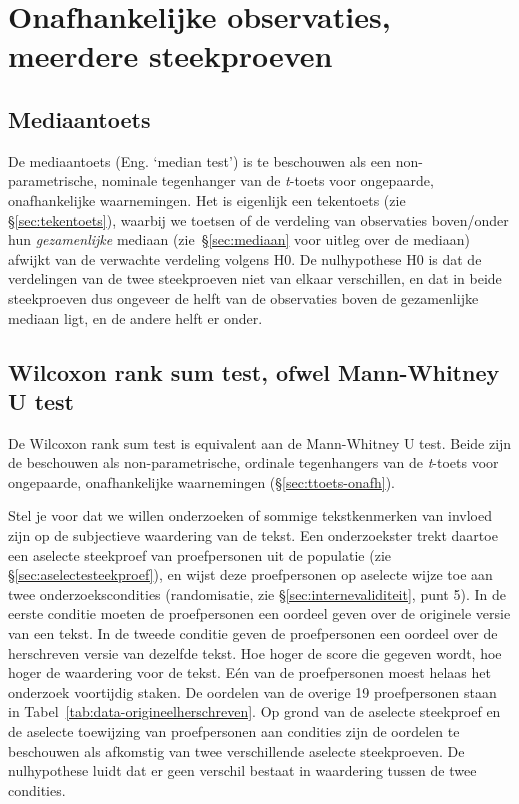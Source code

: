 \documentclass[
]{book}
\begin{document}
\section{Onafhankelijke observaties, meerdere steekproeven}\label{onafhankelijke-observaties-meerdere-steekproeven}

\subsection{Mediaantoets}\label{mediaantoets}

De mediaantoets (Eng. `median test') is te beschouwen als een non-parametrische, nominale
tegenhanger van de \emph{t}-toets voor ongepaarde, onafhankelijke waarnemingen. Het is
eigenlijk een tekentoets (zie §\ref{sec:tekentoets}), waarbij we toetsen of de verdeling van
observaties boven/onder hun \emph{gezamenlijke} mediaan
(zie~§\ref{sec:mediaan} voor uitleg over de mediaan) afwijkt van de verwachte verdeling volgens H0.
De nulhypothese H0 is dat de verdelingen van de twee steekproeven niet
van elkaar verschillen, en dat in beide steekproeven dus ongeveer de
helft van de observaties boven de gezamenlijke mediaan ligt, en de
andere helft er onder.

\subsection{Wilcoxon rank sum test, ofwel Mann-Whitney U test}\label{sec:wilcoxon-rank-sum}

De Wilcoxon rank sum test is equivalent aan de Mann-Whitney U test.
Beide zijn de beschouwen als non-parametrische, ordinale tegenhangers
van de \emph{t}-toets voor ongepaarde, onafhankelijke waarnemingen
(§\ref{sec:ttoets-onafh}).

Stel je voor dat we willen onderzoeken of sommige tekstkenmerken van
invloed zijn op de subjectieve waardering van de tekst. Een
onderzoekster trekt daartoe een aselecte steekproef van proefpersonen
uit de populatie (zie
§\ref{sec:aselectesteekproef}), en wijst deze proefpersonen op
aselecte wijze toe aan twee onderzoekscondities (randomisatie, zie §\ref{sec:internevaliditeit}, punt 5).
In de eerste conditie moeten de proefpersonen een oordeel geven over de
originele versie van een tekst. In de tweede conditie geven de
proefpersonen een oordeel over de herschreven versie van dezelfde tekst.
Hoe hoger de score die gegeven wordt, hoe hoger de waardering voor de
tekst. Eén van de proefpersonen moest helaas het onderzoek voortijdig
staken. De oordelen van de overige 19 proefpersonen staan in
Tabel~\ref{tab:data-origineelherschreven}. Op grond van de aselecte
steekproef en de aselecte toewijzing van proefpersonen aan condities
zijn de oordelen te beschouwen als afkomstig van twee verschillende
aselecte steekproeven. De nulhypothese luidt dat er geen verschil
bestaat in waardering tussen de twee condities.
\end{document}
